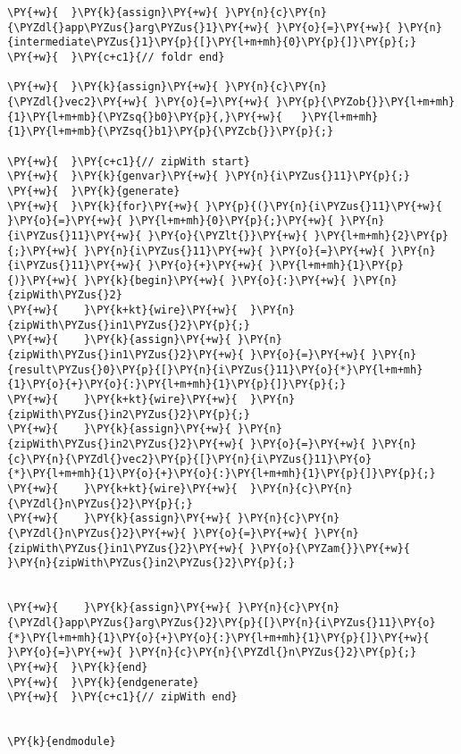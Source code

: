 {\begin{Verbatim}[commandchars=\\\{\}]
\PY{+w}{  }\PY{k}{assign}\PY{+w}{ }\PY{n}{c}\PY{n}{\PYZdl{}app\PYZus{}arg\PYZus{}1}\PY{+w}{ }\PY{o}{=}\PY{+w}{ }\PY{n}{intermediate\PYZus{}1}\PY{p}{[}\PY{l+m+mh}{0}\PY{p}{]}\PY{p}{;}
\PY{+w}{  }\PY{c+c1}{// foldr end}

\PY{+w}{  }\PY{k}{assign}\PY{+w}{ }\PY{n}{c}\PY{n}{\PYZdl{}vec2}\PY{+w}{ }\PY{o}{=}\PY{+w}{ }\PY{p}{\PYZob{}}\PY{l+m+mh}{1}\PY{l+m+mb}{\PYZsq{}b0}\PY{p}{,}\PY{+w}{   }\PY{l+m+mh}{1}\PY{l+m+mb}{\PYZsq{}b1}\PY{p}{\PYZcb{}}\PY{p}{;}

\PY{+w}{  }\PY{c+c1}{// zipWith start}
\PY{+w}{  }\PY{k}{genvar}\PY{+w}{ }\PY{n}{i\PYZus{}11}\PY{p}{;}
\PY{+w}{  }\PY{k}{generate}
\PY{+w}{  }\PY{k}{for}\PY{+w}{ }\PY{p}{(}\PY{n}{i\PYZus{}11}\PY{+w}{ }\PY{o}{=}\PY{+w}{ }\PY{l+m+mh}{0}\PY{p}{;}\PY{+w}{ }\PY{n}{i\PYZus{}11}\PY{+w}{ }\PY{o}{\PYZlt{}}\PY{+w}{ }\PY{l+m+mh}{2}\PY{p}{;}\PY{+w}{ }\PY{n}{i\PYZus{}11}\PY{+w}{ }\PY{o}{=}\PY{+w}{ }\PY{n}{i\PYZus{}11}\PY{+w}{ }\PY{o}{+}\PY{+w}{ }\PY{l+m+mh}{1}\PY{p}{)}\PY{+w}{ }\PY{k}{begin}\PY{+w}{ }\PY{o}{:}\PY{+w}{ }\PY{n}{zipWith\PYZus{}2}
\PY{+w}{    }\PY{k+kt}{wire}\PY{+w}{  }\PY{n}{zipWith\PYZus{}in1\PYZus{}2}\PY{p}{;}
\PY{+w}{    }\PY{k}{assign}\PY{+w}{ }\PY{n}{zipWith\PYZus{}in1\PYZus{}2}\PY{+w}{ }\PY{o}{=}\PY{+w}{ }\PY{n}{result\PYZus{}0}\PY{p}{[}\PY{n}{i\PYZus{}11}\PY{o}{*}\PY{l+m+mh}{1}\PY{o}{+}\PY{o}{:}\PY{l+m+mh}{1}\PY{p}{]}\PY{p}{;}
\PY{+w}{    }\PY{k+kt}{wire}\PY{+w}{  }\PY{n}{zipWith\PYZus{}in2\PYZus{}2}\PY{p}{;}
\PY{+w}{    }\PY{k}{assign}\PY{+w}{ }\PY{n}{zipWith\PYZus{}in2\PYZus{}2}\PY{+w}{ }\PY{o}{=}\PY{+w}{ }\PY{n}{c}\PY{n}{\PYZdl{}vec2}\PY{p}{[}\PY{n}{i\PYZus{}11}\PY{o}{*}\PY{l+m+mh}{1}\PY{o}{+}\PY{o}{:}\PY{l+m+mh}{1}\PY{p}{]}\PY{p}{;}
\PY{+w}{    }\PY{k+kt}{wire}\PY{+w}{  }\PY{n}{c}\PY{n}{\PYZdl{}n\PYZus{}2}\PY{p}{;}
\PY{+w}{    }\PY{k}{assign}\PY{+w}{ }\PY{n}{c}\PY{n}{\PYZdl{}n\PYZus{}2}\PY{+w}{ }\PY{o}{=}\PY{+w}{ }\PY{n}{zipWith\PYZus{}in1\PYZus{}2}\PY{+w}{ }\PY{o}{\PYZam{}}\PY{+w}{ }\PY{n}{zipWith\PYZus{}in2\PYZus{}2}\PY{p}{;}


\PY{+w}{    }\PY{k}{assign}\PY{+w}{ }\PY{n}{c}\PY{n}{\PYZdl{}app\PYZus{}arg\PYZus{}2}\PY{p}{[}\PY{n}{i\PYZus{}11}\PY{o}{*}\PY{l+m+mh}{1}\PY{o}{+}\PY{o}{:}\PY{l+m+mh}{1}\PY{p}{]}\PY{+w}{ }\PY{o}{=}\PY{+w}{ }\PY{n}{c}\PY{n}{\PYZdl{}n\PYZus{}2}\PY{p}{;}
\PY{+w}{  }\PY{k}{end}
\PY{+w}{  }\PY{k}{endgenerate}
\PY{+w}{  }\PY{c+c1}{// zipWith end}


\PY{k}{endmodule}
\end{Verbatim}
}
